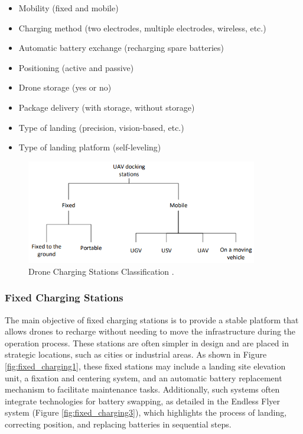     \begin{itemize}
        \item Mobility (fixed and mobile)
        \item Charging method (two electrodes, multiple electrodes, wireless, etc.)
        \item Automatic battery exchange (recharging spare batteries)
        \item Positioning (active and passive)
        \item Drone storage (yes or no)
        \item Package delivery (with storage, without storage)
        \item Type of landing (precision, vision-based, etc.)
        \item Type of landing platform (self-leveling)
    \end{itemize}

    \begin{figure}[H]
        \centering
        \includegraphics[width=0.9\textwidth]{pictures/charging_classification.png}
        \caption{Drone Charging Stations Classification \cite{grlj_docking_stations}.}
        \label{fig:charging_classification}
    \end{figure}

\subsubsection{Fixed Charging Stations}

The main objective of fixed charging stations is to provide a stable platform that allows drones to recharge without needing to move the infrastructure during the operation process. These stations are often simpler in design and are placed in strategic locations, such as cities or industrial areas. As shown in Figure \ref{fig:fixed_charging1}, these fixed stations may include a landing site elevation unit, a fixation and centering system, and an automatic battery replacement mechanism to facilitate maintenance tasks. Additionally, such systems often integrate technologies for battery swapping, as detailed in the Endless Flyer system (Figure \ref{fig:fixed_charging3}), which highlights the process of landing, correcting position, and replacing batteries in sequential steps.

